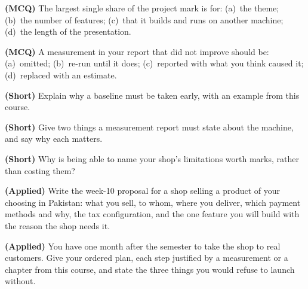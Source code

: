 \begin{reviewq}
  \item \textbf{(MCQ)} The largest single share of the project mark is for:
        (a)~the theme; (b)~the number of features; (c)~that it builds and runs
        on another machine; (d)~the length of the presentation.
  \item \textbf{(MCQ)} A measurement in your report that did not improve
        should be: (a)~omitted; (b)~re-run until it does; (c)~reported with
        what you think caused it; (d)~replaced with an estimate.
  \item \textbf{(Short)} Explain why a baseline must be taken early, with an
        example from this course.
  \item \textbf{(Short)} Give two things a measurement report must state about
        the machine, and say why each matters.
  \item \textbf{(Short)} Why is being able to name your shop's limitations
        worth marks, rather than costing them?
  \item \textbf{(Applied)} Write the week-10 proposal for a shop selling a
        product of your choosing in Pakistan: what you sell, to whom, where you
        deliver, which payment methods and why, the tax configuration, and the
        one feature you will build with the reason the shop needs it.
  \item \textbf{(Applied)} You have one month after the semester to take the
        shop to real customers. Give your ordered plan, each step justified by
        a measurement or a chapter from this course, and state the three things
        you would refuse to launch without.
\end{reviewq}
